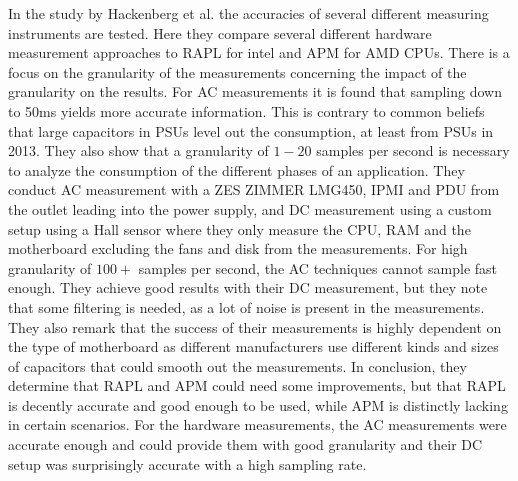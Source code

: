 In the study by Hackenberg et al.\cite{hackenberg2013} the accuracies of several different measuring instruments are tested. Here they compare several different hardware measurement approaches to RAPL for intel and APM for AMD CPUs. There is a focus on the granularity of the measurements concerning the impact of the granularity on the results. For AC measurements it is found that sampling down to 50ms yields more accurate information. This is contrary to common beliefs that large capacitors in PSUs level out the consumption, at least from PSUs in 2013. They also show that a granularity of $1-20$ samples per second is necessary to analyze the consumption of the different phases of an application. They conduct AC measurement with a ZES ZIMMER LMG450, IPMI and PDU from the outlet leading into the power supply, and DC measurement using a custom setup using a Hall sensor where they only measure the CPU, RAM and the motherboard excluding the fans and disk from the measurements. For high granularity of $100+$ samples per second, the AC techniques cannot sample fast enough. They achieve good results with their DC measurement, but they note that some filtering is needed, as a lot of noise is present in the measurements. They also remark that the success of their measurements is highly dependent on the type of motherboard as different manufacturers use different kinds and sizes of capacitors that could smooth out the measurements. In conclusion, they determine that RAPL and APM could need some improvements, but that RAPL is decently accurate and good enough to be used, while APM is distinctly lacking in certain scenarios. For the hardware measurements, the AC measurements were accurate enough and could provide them with good granularity and their DC setup was surprisingly accurate with a high sampling rate.\cite*{hackenberg2013}\newline
